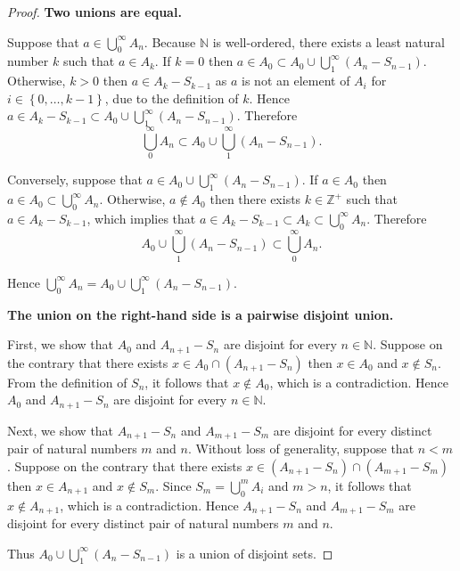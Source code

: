 \begin{proof}
	\textbf{Two unions are equal.}

	Suppose that \( a \in \bigcup^{\infty}_{0} A_{n} \). Because \( \mathbb{N} \) is well-ordered, there exists a least natural number \( k \) such that \( a \in A_{k} \). If \( k = 0 \) then \( a \in A_{0} \subset A_{0} \cup \bigcup^{\infty}_{1}(A_{n} - S_{n-1}) \). Otherwise, \( k > 0 \) then \( a \in A_{k} - S_{k-1} \) as \( a \) is not an element of \( A_{i} \) for \( i \in \left\{ 0, \ldots, k - 1 \right\} \), due to the definition of \( k \). Hence \( a \in A_{k} - S_{k-1} \subset A_{0} \cup \displaystyle\bigcup^{\infty}_{1}(A_{n} - S_{n-1}) \). Therefore
	\[
		\bigcup^{\infty}_{0} A_{n} \subset A_{0} \cup \bigcup^{\infty}_{1}(A_{n} - S_{n-1}).
	\]

	Conversely, suppose that \( a \in A_{0} \cup \displaystyle\bigcup^{\infty}_{1}(A_{n} - S_{n-1}) \). If \( a \in A_{0} \) then \( a \in A_{0} \subset \displaystyle\bigcup^{\infty}_{0} A_{n} \). Otherwise, \( a \notin A_{0} \) then there exists \( k \in \mathbb{Z}^{+} \) such that \( a \in A_{k} - S_{k-1} \), which implies that \( a \in A_{k} - S_{k-1} \subset A_{k} \subset \displaystyle\bigcup^{\infty}_{0} A_{n} \). Therefore
	\[
		A_{0} \cup \bigcup^{\infty}_{1}(A_{n} - S_{n-1}) \subset \bigcup^{\infty}_{0} A_{n}.
	\]

	Hence \( \displaystyle\bigcup^{\infty}_{0} A_{n} = A_{0} \cup \bigcup^{\infty}_{1}(A_{n} - S_{n-1}) \).

	\textbf{The union on the right-hand side is a pairwise disjoint union.}

	First, we show that \( A_{0} \) and \( A_{n+1} - S_{n} \) are disjoint for every \( n \in \mathbb{N} \). Suppose on the contrary that there exists \( x \in A_{0} \cap (A_{n+1} - S_{n}) \) then \( x \in A_{0} \) and \( x \notin S_{n} \). From the definition of \( S_{n} \), it follows that \( x \notin A_{0} \), which is a contradiction. Hence \( A_{0} \) and \( A_{n+1} - S_{n} \) are disjoint for every \( n \in \mathbb{N} \).

	Next, we show that \( A_{n+1} - S_{n} \) and \( A_{m+1} - S_{m} \) are disjoint for every distinct pair of natural numbers \( m \) and \( n \). Without loss of generality, suppose that \( n < m \). Suppose on the contrary that there exists \( x \in (A_{n+1} - S_{n}) \cap (A_{m+1} - S_{m}) \) then \( x \in A_{n+1} \) and \( x \notin S_{m} \). Since \( S_{m} = \displaystyle\bigcup^{m}_{0}A_{i} \) and \( m > n \), it follows that \( x \notin A_{n+1} \), which is a contradiction. Hence \( A_{n+1} - S_{n} \) and \( A_{m+1} - S_{m} \) are disjoint for every distinct pair of natural numbers \( m \) and \( n \).

	Thus \( A_{0} \cup \displaystyle\bigcup^{\infty}_{1}(A_{n} - S_{n-1}) \) is a union of disjoint sets.
\end{proof}

